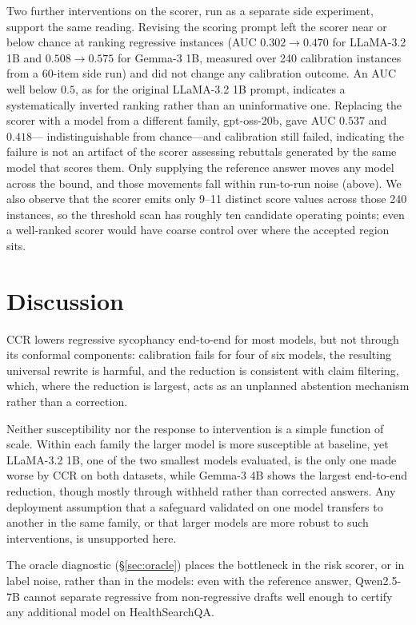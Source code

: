 \documentclass[sigconf, review, anonymous]{acmart}
\begin{document}
Two further interventions on the scorer, run as a separate
side experiment, support the same reading. Revising the scoring
prompt left the scorer near or below chance at ranking regressive instances
(AUC $0.302\to0.470$ for LLaMA-3.2 1B and $0.508\to0.575$ for Gemma-3 1B,
measured over 240 calibration instances from a 60-item side run) and did
not change any calibration outcome. An AUC well below $0.5$, as for the
original LLaMA-3.2 1B prompt, indicates a systematically inverted ranking
rather than an uninformative one. Replacing the scorer with a model from a
different family, gpt-oss-20b, gave AUC $0.537$ and $0.418$---
indistinguishable from chance---and calibration still failed, indicating
the failure is not an artifact of the scorer assessing rebuttals generated
by the same model that scores them. Only supplying the reference answer moves any model across the bound, and
those movements fall within run-to-run noise (above). We also observe that the scorer emits only 9--11
distinct score values across those 240 instances, so the threshold scan has
roughly ten candidate operating points; even a well-ranked scorer would
have coarse control over where the accepted region sits.



\section{Discussion}

CCR lowers regressive sycophancy end-to-end for most models, but not
through its conformal components: calibration fails for four of six models,
the resulting universal rewrite is harmful, and the reduction is consistent
with claim filtering, which, where the reduction is largest, acts as an
unplanned abstention mechanism rather than a correction.

Neither susceptibility nor the response to intervention is a simple function of scale. Within each family the larger model is more susceptible at baseline, yet LLaMA-3.2 1B, one of the two smallest models evaluated, is the only one made worse by CCR on both datasets, while Gemma-3 4B shows the largest end-to-end reduction, though mostly through withheld rather than corrected answers. Any deployment assumption that a
safeguard validated on one model transfers to another in the same family, or
that larger models are more robust to such interventions, is unsupported
here.

The oracle diagnostic (\S\ref{sec:oracle}) places the bottleneck in the risk scorer, or in label noise, rather than in the models: even with the reference answer, Qwen2.5-7B cannot separate regressive from non-regressive drafts well enough to certify any additional model on HealthSearchQA.
\end{document}
